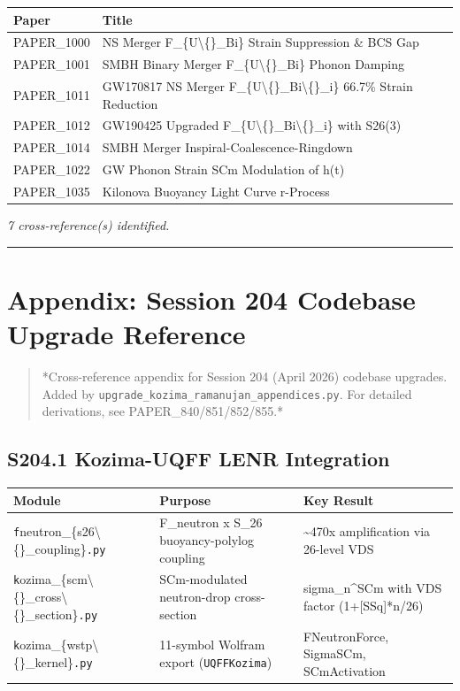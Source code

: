\documentclass[11pt]{article}
\begin{document}
\begin{center}
\begin{longtable}{ll}
\toprule
Paper & Title \tabularnewline
\midrule
\endhead
PAPER\_1000 & NS Merger F\_\{U\textbackslash\{\}\_Bi\} Strain Suppression \& BCS Gap \tabularnewline
PAPER\_1001 & SMBH Binary Merger F\_\{U\textbackslash\{\}\_Bi\} Phonon Damping \tabularnewline
PAPER\_1011 & GW170817 NS Merger F\_\{U\textbackslash\{\}\_Bi\textbackslash\{\}\_i\} 66.7\% Strain Reduction \tabularnewline
PAPER\_1012 & GW190425 Upgraded F\_\{U\textbackslash\{\}\_Bi\textbackslash\{\}\_i\} with S26(3) \tabularnewline
PAPER\_1014 & SMBH Merger Inspiral-Coalescence-Ringdown \tabularnewline
PAPER\_1022 & GW Phonon Strain SCm Modulation of h(t) \tabularnewline
PAPER\_1035 & Kilonova Buoyancy Light Curve r-Process \tabularnewline
\bottomrule
\end{longtable}
\end{center}

\emph{7 cross-reference(s) identified.}

\noindent\rule{\textwidth}{0.4pt}

\section*{Appendix: Session 204 Codebase Upgrade Reference}

\begin{quote}
*Cross-reference appendix for Session 204 (April 2026) codebase upgrades.
Added by \verb|upgrade_kozima_ramanujan_appendices.py|. For detailed derivations,
see PAPER\_840/851/852/855.*
\end{quote}

\subsection*{S204.1 Kozima-UQFF LENR Integration}

\begin{center}
\begin{longtable}{lll}
\toprule
Module & Purpose & Key Result \tabularnewline
\midrule
\endhead
\verb|f|neutron\_\{s26\textbackslash\{\}\_coupling\}\verb|.py| & F\_neutron x S\_26 buoyancy-polylog coupling & \textasciitilde{}470x amplification via 26-level VDS \tabularnewline
\verb|k|ozima\_\{scm\textbackslash\{\}\_cross\textbackslash\{\}\_section\}\verb|.py| & SCm-modulated neutron-drop cross-section & sigma\_n\textasciicircum{}SCm with VDS factor (1+[SSq]*n/26) \tabularnewline
\verb|k|ozima\_\{wstp\textbackslash\{\}\_kernel\}\verb|.py| & 11-symbol Wolfram export (\verb|UQFFKozima|) & FNeutronForce, SigmaSCm, SCmActivation \tabularnewline
\bottomrule
\end{longtable}
\end{center}
\end{document}

